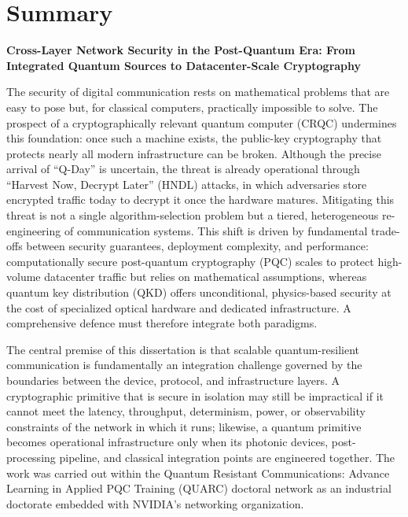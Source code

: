 \chapter*{Summary}

\noindent\textbf{Cross-Layer Network Security in the Post-Quantum Era:
From Integrated Quantum Sources to Datacenter-Scale Cryptography}

\vspace{1.5em}

The security of digital communication rests on mathematical problems that are
easy to pose but, for classical computers, practically impossible to solve. The
prospect of a cryptographically relevant quantum computer (CRQC) undermines this
foundation: once such a machine exists, the public-key cryptography that protects
nearly all modern infrastructure can be broken. Although the precise arrival of
``Q-Day'' is uncertain, the threat is already operational through
``Harvest Now, Decrypt Later'' (HNDL) attacks, in which adversaries store encrypted
traffic today to decrypt it once the hardware matures. Mitigating this threat
is not a single algorithm-selection problem but a tiered, heterogeneous
re-engineering of communication systems. This shift is driven by fundamental
trade-offs between security guarantees, deployment complexity, and performance:
computationally secure post-quantum cryptography (PQC) scales to protect
high-volume datacenter traffic but relies on mathematical assumptions, whereas
quantum key distribution (QKD) offers unconditional, physics-based security at
the cost of specialized optical hardware and dedicated infrastructure. A
comprehensive defence must therefore integrate both paradigms.

The central premise of this dissertation is that scalable quantum-resilient
communication is fundamentally an integration challenge governed by the boundaries
between the device, protocol, and infrastructure layers. A cryptographic primitive that is
secure in isolation may still be impractical if it cannot meet the latency,
throughput, determinism, power, or observability constraints of the network in
which it runs; likewise, a quantum primitive becomes operational infrastructure
only when its photonic devices, post-processing pipeline, and classical
integration points are engineered together. The work was carried out within the
Quantum Resistant Communications: Advance Learning in Applied PQC Training
(QUARC) doctoral network as an industrial doctorate embedded with NVIDIA's
networking organization.


